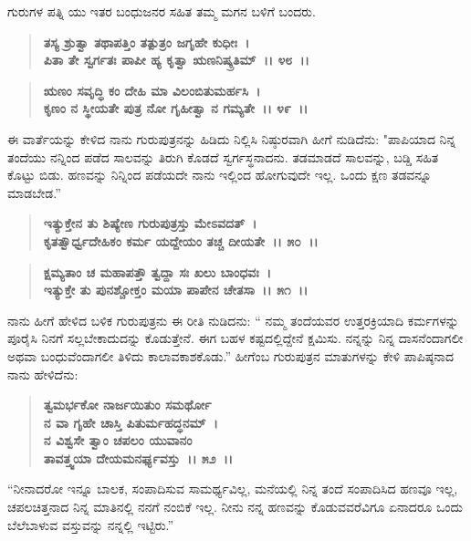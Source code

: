 ಗುರುಗಳ ಪತ್ನಿ ಯು ಇತರ ಬಂಧುಜನರ ಸಹಿತ ತಮ್ಮ ಮಗನ ಬಳಿಗೆ ಬಂದರು.

\begin{verse}
\textbf{ತಸ್ಯ ಶ್ರುತ್ವಾ ತಥಾಪತ್ತಿಂ ತತ್ಪುತ್ರಂ ಜಗೃಹೇ ಕುಧೀಃ~।}\\\textbf{ಪಿತಾ ತೇ ಸ್ವರ್ಗತಃ ಪಾಪೀ ಹ್ಯ ಕೃತ್ವಾ ಋಣನಿಷ್ಕ್ರತಿಮ್~।। ೪೮~।। }
\end{verse}

\begin{verse}
\textbf{ಋಣಂ ಸವೃದ್ಧಿ ಕಂ ದೇಹಿ ಮಾ ವಿಲಂಬಿತುಮರ್ಹಸಿ~।}\\\textbf{ಕೃಣಂ ನ ಸ್ಥೀಯತೇ ಪುತ್ರ ನೋ ಗೃಹೀತ್ವಾ ನ ಗಮ್ಯತೇ~।। ೪೯~।।}
\end{verse}

ಈ ವಾರ್ತೆಯನ್ನು ಕೇಳಿದ ನಾನು ಗುರುಪುತ್ರನನ್ನು ಹಿಡಿದು ನಿಲ್ಲಿಸಿ ನಿಷ್ಠುರವಾಗಿ ಹೀಗೆ ನುಡಿದೆನು: "ಪಾಪಿಯಾದ ನಿನ್ನ ತಂದೆಯು ನನ್ನಿಂದ ಪಡೆದ ಸಾಲವನ್ನು ತಿರುಗಿ ಕೊಡದೆ ಸ್ವರ್ಗಸ್ಥನಾದನು. ತಡಮಾಡದೆ ಸಾಲವನ್ನು, ಬಡ್ಡಿ ಸಹಿತ ಕೊಟ್ಟು ಬಿಡು. ಹಣವನ್ನು ನಿನ್ನಿಂದ ಪಡೆಯದೇ ನಾನು ಇಲ್ಲಿಂದ ಹೋಗುವುದೇ ಇಲ್ಲ. ಒಂದು ಕ್ಷಣ ತಡವನ್ನೂ ಮಾಡಬೇಡ.”

\begin{verse}
\textbf{ಇತ್ಯುಕ್ತೇನ ತು ಶಿಷ್ಯೇಣ ಗುರುಪುತ್ರಸ್ತು ಮೇಽವದತ್~।}\\\textbf{ ಕೃತತ್ವೌರ್ಧ್ವದೇಹಿಕಂ ಕರ್ಮ ಯದ್ದೇಯಂ ತಚ್ಚ ದೀಯತೇ~।। ೫೦~।। }
\end{verse}

\begin{verse}
\textbf{ಕ್ಷಮ್ಯತಾಂ ಚ ಮಹಾಪತ್ತೌ ತ್ವದ್ದಾ ಸಃ ಖಲು ಬಾಂಧವಃ~।}\\\textbf{ಇತ್ಯುಕ್ತೇ ತು ಪುನಶ್ಚೋಕ್ತಂ ಮಯಾ ಪಾಪೇನ ಚೇತಸಾ~।। ೫೧~।।}
\end{verse}

ನಾನು ಹೀಗೆ ಹೇಳಿದ ಬಳಿಕ ಗುರುಪುತ್ರನು ಈ ರೀತಿ ನುಡಿದನು: “ ನಮ್ಮ ತಂದೆಯವರ ಉತ್ತರಕ್ರಿಯಾದಿ ಕರ್ಮಗಳನ್ನು ಪೂರೈಸಿ ನಿನಗೆ ಸಲ್ಲಬೇಕಾದುದನ್ನು ಕೊಡುತ್ತೇನೆ. ಈಗ ಬಹಳ ಕಷ್ಟದಲ್ಲಿದ್ದೇನೆ ಕ್ಷಮಿಸು. ನನ್ನನ್ನು ನಿನ್ನ ದಾಸನೆಂದಾಗಲೀ ಅಥವಾ ಬಂಧುವೆಂದಾಗಲೀ ತಿಳಿದು ಕಾಲಾವಕಾಶಕೊಡು.” ಹೀಗೆಂಬ ಗುರುಪುತ್ರನ ಮಾತುಗಳನ್ನು ಕೇಳಿ ಪಾಪಿಷ್ಠನಾದ ನಾನು ಹೇಳಿದೆನು:

\begin{verse}
\textbf{ತ್ವಮರ್ಭಕೋ ನಾರ್ಜಯಿತುಂ ಸಮರ್ಥೋ}\\\textbf{ನ ವಾ ಗೃಹೇ ಚಾಸ್ತಿ ಪಿತುರ್ಮಹದ್ಧನಮ್~।}\\\textbf{ನ ವಿಶ್ವಸೇ ತ್ವಾಂ ಚಪಲಂ ಯುವಾನಂ} \\\textbf{ತಾವತ್ತ್ವಯಾ ದೇಯಮನರ್ಘ್ಯವಸ್ತು~।। ೫೨~।।}
\end{verse}

“ನೀನಾದರೋ ಇನ್ನೂ ಬಾಲಕ, ಸಂಪಾದಿಸುವ ಸಾಮರ್ಥ್ಯವಿಲ್ಲ, ಮನೆಯಲ್ಲಿ ನಿನ್ನ ತಂದೆ ಸಂಪಾದಿಸಿದ ಹಣವೂ ಇಲ್ಲ, ಚಪಲಚಿತ್ತನಾದ ನಿನ್ನ ಮಾತಿನಲ್ಲಿ ನನಗೆ ನಂಬಿಕೆ ಇಲ್ಲ. ನೀನು ನನ್ನ ಹಣವನ್ನು ಕೊಡುವವರೆವಿಗೂ ಏನಾದರೂ ಒಂದು ಬೆಲೆಬಾಳುವ ವಸ್ತುವನ್ನು ನನ್ನಲ್ಲಿ ಇಟ್ಟಿರು.”

